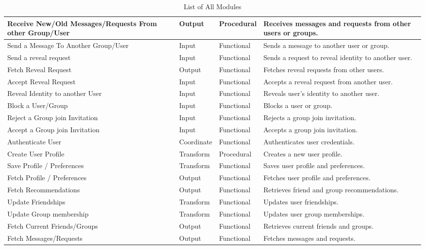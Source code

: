 \documentclass[12pt,a4paper]{article}
\begin{document}
\begin{table}[H]
    \hspace{-1.6cm}
    \renewcommand{\arraystretch}{1.25}
    \begin{tabular}{|p{4cm}|p{2cm}|p{3cm}|p{6cm}|}
    \hline
        Receive New/Old Messages/Requests From other Group/User & Output & Procedural & Receives messages and requests from other users or groups. \\
        \hline
        Send a Message To Another Group/User & Input & Functional & Sends a message to another user or group. \\
        \hline
        Send a reveal request & Input & Functional & Sends a request to reveal identity to another user. \\
        \hline
        Fetch Reveal Request & Output & Functional & Fetches reveal requests from other users. \\
        \hline
        Accept Reveal Request & Input & Functional & Accepts a reveal request from another user. \\
        \hline
        Reveal Identity to another User & Input & Functional & Reveals user's identity to another user. \\
        \hline
        Block a User/Group & Input & Functional & Blocks a user or group. \\
        \hline
        Reject a Group join Invitation & Input & Functional & Rejects a group join invitation. \\
        \hline
        Accept a Group join Invitation & Input & Functional & Accepts a group join invitation. \\
        \hline
        Authenticate User & Coordinate & Functional & Authenticates user credentials. \\
        \hline
        Create User Profile & Transform & Procedural & Creates a new user profile. \\
        \hline
        Save Profile / Preferences & Transform & Functional & Saves user profile and preferences. \\
        \hline
        Fetch Profile / Preferences & Output & Functional & Fetches user profile and preferences. \\
        \hline
        Fetch Recommendations & Output & Functional & Retrieves friend and group recommendations. \\
        \hline
        Update Friendships & Transform & Functional & Updates user friendships. \\
        \hline
        Update Group membership & Transform & Functional & Updates user group memberships. \\
        \hline
        Fetch Current Friends/Groups & Output & Functional & Retrieves current friends and groups. \\
        \hline
        Fetch Messages/Requests & Output & Functional & Fetches messages and requests. \\
        \hline
        \end{tabular}
    \caption{List of All Modules}
\end{table}
\end{document}
